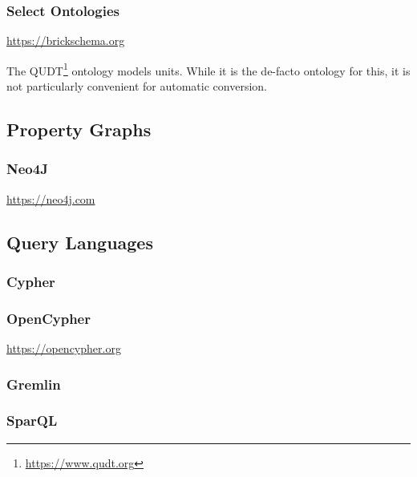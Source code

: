 \subsubsection{Select Ontologies}

\url{https://brickschema.org}



The QUDT\footnote{\url{https://www.qudt.org}} ontology models units. While it is the de-facto ontology for this, it is not particularly convenient for automatic conversion.

\subsection{Property Graphs}
\subsubsection{Neo4J}

\url{https://neo4j.com}

\subsection{Query Languages}
\subsubsection{Cypher}
\subsubsection{OpenCypher}

\url{https://opencypher.org}

\subsubsection{Gremlin}
\subsubsection{SparQL}


